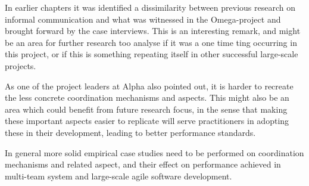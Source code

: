 In earlier chapters it was identified a dissimilarity between previous research on informal communication and what was witnessed in the Omega-project and brought forward by the case interviews. This is an interesting remark, and might be an area for further research too analyse if it was a one time ting occurring in this project, or if this is something repeating itself in other successful large-scale projects.

As one of the project leaders at Alpha also pointed out, it is harder to recreate the less concrete coordination mechanisms and aspects. This might also be an area which could benefit from future research focus, in the sense that making these important aspects easier to replicate will serve practitioners in adopting these in their development, leading to better performance standards.

In general more solid empirical case studies need to be performed on coordination mechanisms and related aspect, and their effect on performance achieved in multi-team system and large-scale agile software development.

\newpage